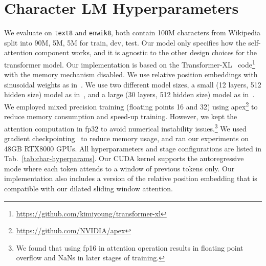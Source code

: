 
\section{Character LM Hyperparameters}
\label{sec:charlmapp}

We evaluate on \texttt{text8} and \texttt{enwik8}, both contain 100M 
characters from Wikipedia split into 90M, 5M, 5M for train, dev, test. 
Our model only specifies how the self-attention component works, and it is 
agnostic to the other design choices for the transformer model. 
Our implementation is based on the Transformer-XL~\cite{transformerxl}
code\footnote{\url{https://github.com/kimiyoung/transformer-xl}} 
with the memory mechanism disabled. 
We use relative position embeddings with sinusoidal weights as in~\citet{transformerxl}. 
We use two different model sizes, a small (12 layers, 512 hidden size) model as in~\citet{transformerxl}, 
and a large (30 layers, 512 hidden size) model as in~\citet{sparseOpenai}.
We employed mixed precision training (floating points 16 and 32) using apex\footnote{\url{https://github.com/NVIDIA/apex}} to reduce memory consumption and speed-up training. However,  we kept the attention computation in fp32
to avoid numerical instability issues.\footnote{We found that using fp16 in attention operation results in floating point overflow and NaNs in later stages of training.}
We used gradient checkpointing~\cite{gradckpt} to reduce memory usage, and ran our experiments on 48GB RTX8000 GPUs. 
All hyperparameters and stage configurations are listed in Tab.~\ref{tab:char-hyperparams}. 
Our CUDA kernel supports the autoregressive mode where each token 
attends to a window of previous tokens only. Our implementation 
also includes a version of the relative position embedding
that is compatible with our dilated sliding window attention.

